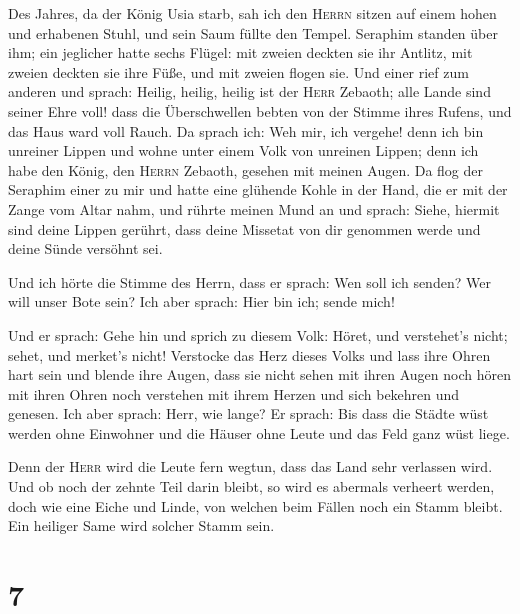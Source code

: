  Des Jahres, da der König Usia starb, sah ich den
\textsc{Herrn} sitzen auf einem hohen und erhabenen Stuhl, und sein Saum
füllte den Tempel.  Seraphim standen über ihm; ein
jeglicher hatte sechs Flügel: mit zweien deckten sie ihr Antlitz, mit
zweien deckten sie ihre Füße, und mit zweien flogen sie. 
Und einer rief zum anderen und sprach: Heilig, heilig, heilig ist der
\textsc{Herr} Zebaoth; alle Lande sind seiner Ehre voll! 
dass die Überschwellen bebten von der Stimme ihres Rufens, und das Haus
ward voll Rauch.  Da sprach ich: Weh mir, ich vergehe!
denn ich bin unreiner Lippen und wohne unter einem Volk von unreinen
Lippen; denn ich habe den König, den \textsc{Herrn} Zebaoth, gesehen mit
meinen Augen.  Da flog der Seraphim einer zu mir und hatte
eine glühende Kohle in der Hand, die er mit der Zange vom Altar nahm,
 und rührte meinen Mund an und sprach: Siehe, hiermit sind
deine Lippen gerührt, dass deine Missetat von dir genommen werde und
deine Sünde versöhnt sei.

 Und ich hörte die Stimme des Herrn, dass er sprach: Wen
soll ich senden? Wer will unser Bote sein? Ich aber sprach: Hier bin
ich; sende mich!

 Und er sprach: Gehe hin und sprich zu diesem Volk: Höret,
und verstehet's nicht; sehet, und merket's nicht! 
Verstocke das Herz dieses Volks und lass ihre Ohren hart sein und blende
ihre Augen, dass sie nicht sehen mit ihren Augen noch hören mit ihren
Ohren noch verstehen mit ihrem Herzen und sich bekehren und genesen.
 Ich aber sprach: Herr, wie lange? Er sprach: Bis dass
die Städte wüst werden ohne Einwohner und die Häuser ohne Leute und das
Feld ganz wüst liege.

 Denn der \textsc{Herr} wird die Leute fern wegtun, dass
das Land sehr verlassen wird.  Und ob noch der zehnte
Teil darin bleibt, so wird es abermals verheert werden, doch wie eine
Eiche und Linde, von welchen beim Fällen noch ein Stamm bleibt. Ein
heiliger Same wird solcher Stamm sein.

\hypertarget{section-6}{%
\section{7}\label{section-6}}

